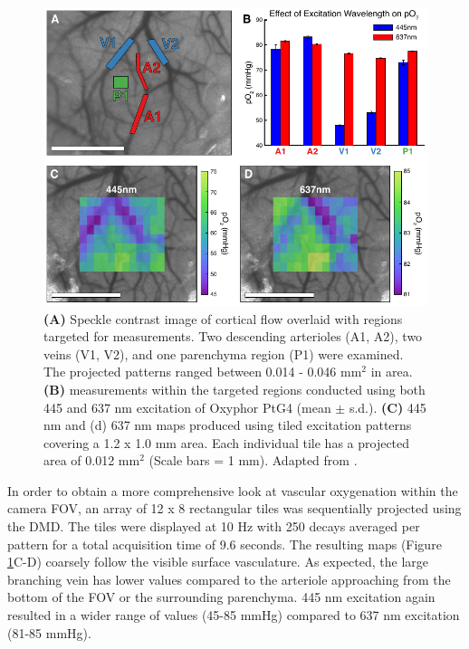\begin{figure}
    \includegraphics{figures/chapter_2/staticpO2.pdf}
    \caption[\textbf{(A)} Speckle contrast image of cortical flow overlaid with regions targeted for  measurements. Two descending arterioles (A1, A2), two veins (V1, V2), and one parenchyma region (P1) were examined. The projected patterns ranged between 0.014 - 0.046 mm$^2$ in area. \textbf{(B)}  measurements within the targeted regions conducted using both 445 and 637 nm excitation of Oxyphor PtG4 (mean $\pm$ s.d.). \textbf{(C)} 445 nm and (d) 637 nm  maps produced using tiled excitation patterns covering a 1.2 x 1.0 mm area. Each individual tile has a projected area of 0.012 mm$^2$ (Scale bars = 1 mm).]{
        \label{fig:staticpO2}
        \textbf{(A)} Speckle contrast image of cortical flow overlaid with regions targeted for  measurements. Two descending arterioles (A1, A2), two veins (V1, V2), and one parenchyma region (P1) were examined. The projected patterns ranged between 0.014 - 0.046 mm$^2$ in area. \textbf{(B)}  measurements within the targeted regions conducted using both 445 and 637 nm excitation of Oxyphor PtG4 (mean $\pm$ s.d.). \textbf{(C)} 445 nm and (d) 637 nm  maps produced using tiled excitation patterns covering a 1.2 x 1.0 mm area. Each individual tile has a projected area of 0.012 mm$^2$ (Scale bars = 1 mm). Adapted from \cite{Sullender:2018ff}.
    }
\end{figure}

In order to obtain a more comprehensive look at vascular oxygenation within the camera FOV, an array of 12 x 8 rectangular tiles was sequentially projected using the DMD. The tiles were displayed at 10 Hz with 250 decays averaged per pattern for a total acquisition time of 9.6 seconds. The resulting  maps (Figure \ref{fig:staticpO2}C-D) coarsely follow the visible surface vasculature. As expected, the large branching vein has lower  values compared to the arteriole approaching from the bottom of the FOV or the surrounding parenchyma. 445 nm excitation again resulted in a wider range of  values (45-85 mmHg) compared to 637 nm excitation (81-85 mmHg).

